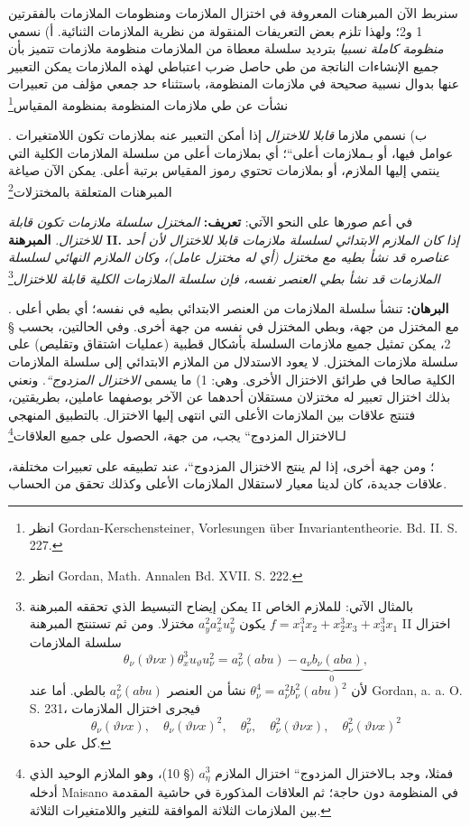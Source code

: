\documentclass[11pt]{article}
\providecommand{\glqq}{\textquotedblbase}
\providecommand{\grqq}{\textquotedblleft}
\newcommand{\srcLTR}[1]{\relax\ifmmode\text{\mbox{\babelsublr{\foreignlanguage{english}{#1}}}}\else\babelsublr{\foreignlanguage{english}{#1}}\fi}
\newcommand{\srcfn}[2]{\begingroup\renewcommand{\thefootnote}{\srcLTR{#1}}\footnote{#2}\addtocounter{footnote}{-1}\endgroup}
\begin{document}
سنربط الآن المبرهنات المعروفة في اختزال الملازمات ومنظومات الملازمات بالفقرتين 1 و2؛ ولهذا تلزم بعض التعريفات المنقولة من نظرية الملازمات الثنائية.
أ) نسمي \emph{منظومة كاملة نسبيا} بترديد سلسلة معطاة من الملازمات منظومة ملازمات تتميز بأن جميع الإنشاءات الناتجة من طي حاصل ضرب اعتباطي لهذه الملازمات يمكن التعبير عنها بدوال نسبية صحيحة في ملازمات المنظومة، باستثناء حد جمعي مؤلف من تعبيرات نشأت عن طي ملازمات المنظومة بمنظومة المقياس\srcfn{*)}{انظر Gordan-Kerschensteiner, Vorlesungen über Invariantentheorie. Bd. II. S. 227.}.
ب) نسمي ملازما \emph{قابلا للاختزال} إذا أمكن التعبير عنه بملازمات تكون اللامتغيرات عوامل فيها، أو بـ\glqq{}ملازمات أعلى\grqq{}؛ أي بملازمات أعلى من سلسلة الملازمات الكلية التي ينتمي إليها الملازم، أو بملازمات تحتوي رموز المقياس برتبة أعلى.
يمكن الآن صياغة المبرهنات المتعلقة بالمختزلات\srcfn{**)}{انظر Gordan, Math. Annalen Bd. XVII. S. 222.} في أعم صورها على النحو الآتي:
\textbf{تعريف:} \emph{المختزل سلسلة ملازمات تكون قابلة للاختزال.}
\textbf{المبرهنة II.} \emph{إذا كان الملازم الابتدائي لسلسلة ملازمات قابلا للاختزال لأن أحد عناصره قد نشأ بطيه مع مختزل (أي له مختزل عامل)، وكان الملازم النهائي لسلسلة الملازمات قد نشأ بطي العنصر نفسه، فإن سلسلة الملازمات الكلية قابلة للاختزال}\srcfn{*)}{يمكن إيضاح التبسيط الذي تحققه المبرهنة II بالمثال الآتي: للملازم الخاص $f=x_1^3x_2+x_2^3x_3+x_3^3x_1$ يكون $a_y^2a_x^2u_y^2$ مختزلا. ومن ثم تستنتج المبرهنة II اختزال سلسلة الملازمات
\[
\theta_\nu(\vartheta\nu x)\theta_x^3u_\vartheta u_\nu^2
=
a_\nu^2(abu)-\underbrace{a_\nu b_\nu(aba)}_{0},
\]
لأن $\theta_\nu^4=a_\nu^2b_\nu^2(abu)^2$ نشأ من العنصر $a_\nu^2(abu)$ بالطي. أما عند Gordan, a. a. O. S. 231، فيجرى اختزال الملازمات
\[
\theta_\nu(\vartheta\nu x),\quad \theta_\nu(\vartheta\nu x)^2,\quad
\theta_\nu^2,\quad \theta_\nu^2(\vartheta\nu x),\quad
\theta_\nu^2(\vartheta\nu x)^2
\]
كل على حدة.}.
\textbf{البرهان:} تنشأ سلسلة الملازمات من العنصر الابتدائي بطيه في نفسه؛ أي بطي أعلى مع المختزل من جهة، وبطي المختزل في نفسه من جهة أخرى. وفي الحالتين، بحسب § 2، يمكن تمثيل جميع ملازمات السلسلة بأشكال قطبية (عمليات اشتقاق وتقليص) على سلسلة ملازمات المختزل.
لا يعود الاستدلال من الملازم الابتدائي إلى سلسلة الملازمات الكلية صالحا في طرائق الاختزال الأخرى. وهي:
1) ما يسمى \emph{\glqq{}الاختزال المزدوج\grqq{}}.
ونعني بذلك اختزال تعبير له مختزلان مستقلان أحدهما عن الآخر بوصفهما عاملين، بطريقتين، فتنتج علاقات بين الملازمات الأعلى التي انتهى إليها الاختزال.
بالتطبيق المنهجي لـ\glqq{}الاختزال المزدوج\grqq{} يجب، من جهة، الحصول على جميع العلاقات\srcfn{**)}{فمثلا، وجد بـ\glqq{}الاختزال المزدوج\grqq{} اختزال الملازم $a_\eta^3$ (§ 10)، وهو الملازم الوحيد الذي أدخله Maisano في المنظومة دون حاجة؛ ثم العلاقات المذكورة في حاشية المقدمة بين الملازمات الثلاثة الموافقة للتغير واللامتغيرات الثلاثة.}؛ ومن جهة أخرى، إذا لم ينتج \glqq{}الاختزال المزدوج\grqq{}، عند تطبيقه على تعبيرات مختلفة، علاقات جديدة، كان لدينا معيار لاستقلال الملازمات الأعلى وكذلك تحقق من الحساب.
\end{document}
